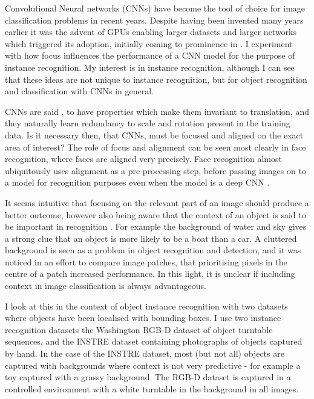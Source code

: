 Convolutional Neural networks (\gls{CNN}s) \cite{LeCun1998} have become the tool of choice for image classification problems in recent years. Despite having been invented many years earlier it was the advent of \gls{GPU}s enabling larger datasets and larger networks which triggered its adoption, initially coming to prominence in \cite {Krizhevsky2012}.  I experiment with how focus influences the performance of a CNN model for the purpose of instance recognition. My interest is in instance recognition, although I can see that these ideas are not unique to instance recognition, but for object recognition and classification with \gls{CNN}s in general.

\gls{CNN}s are said \cite{Krizhevsky2012}, to have properties which make them invariant to translation, and they naturally learn redundancy to scale and rotation present in the training data. Is it necessary then, that \gls{CNN}s, must be focused and aligned on the exact area of interest? The role of focus and alignment can be seen most clearly in face recognition, where faces are aligned very precisely. Face recognition almost ubiquitously uses alignment as a pre-processing step, before passing images on to a model for recognition purposes even when the model is a deep CNN \cite{Taigman2014}.

It seems intuitive that focusing on the relevant part of an image should produce a better outcome, however also being aware that the context of an object is said to be important in recognition \cite{Oliva2007}. For example the background of water and sky gives a strong clue that an object is more likely to be a boat than a car. A cluttered background is seen as a problem in object recognition and detection, and it was noticed in an effort to compare image patches, that prioritising pixels in the centre of a patch \cite{Zagoruyko2015} increased performance. In this light, it is unclear if including context in image classification is always advantageous. 

I look at this in the context of object instance recognition with two datasets where objects have been localised with bounding boxes. I use two instance recognition datasets the Washington RGB-D dataset \cite{Lai2011} of object turntable sequences, and the INSTRE dataset \cite{Wang2015} containing photographs of objects captured by hand. In the case of the INSTRE dataset, most (but not all) objects are captured with backgrounds where context is not very predictive - for example a toy captured with a grassy background. The RGB-D dataset is captured in a controlled environment with a white turntable in the background in all images.

